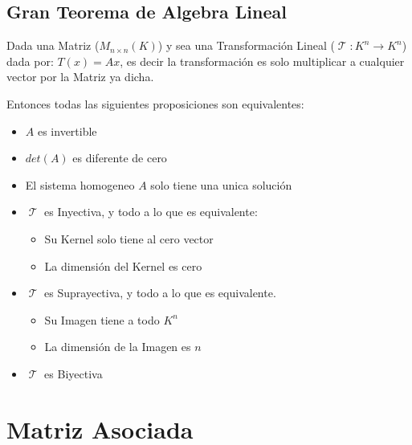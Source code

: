 \documentclass[12pt]{report}                                    %
\DeclareMathOperator \LinealTransformation {\mathcal{T}}
\begin{document}
    \clearpage
    \section{Gran Teorema de Algebra Lineal}

        Dada una Matriz ($M_{n \times n} (K)$) y sea una Transformación Lineal
        ($\LinealTransformation : K^n \to K^n$) dada por: $T(x) = Ax$, es decir
        la transformación es solo multiplicar a cualquier vector por la Matriz ya 
        dicha.

        Entonces todas las siguientes proposiciones son equivalentes:
        \begin{itemize}
            \item $A$ es invertible
            \item $det(A)$ es diferente de cero
            \item El sistema homogeneo $A$ solo tiene una unica solución 
            \item $\LinealTransformation$ es Inyectiva, y todo a lo que es equivalente:
                \begin{itemize}
                    \item Su Kernel solo tiene al cero vector
                    \item La dimensión del Kernel es cero
                \end{itemize}

            \item $\LinealTransformation$ es Suprayectiva, y todo a lo que es equivalente.
                \begin{itemize}
                    \item Su Imagen tiene a todo $K^n$
                    \item La dimensión de la Imagen es $n$
                \end{itemize}
            \item $\LinealTransformation$ es Biyectiva
        \end{itemize}

\chapter{Matriz Asociada}
\end{document}
